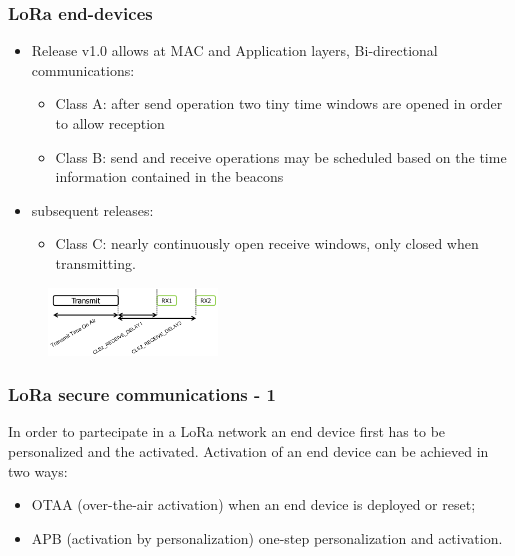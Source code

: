 \begin{frame}[fragile]
  \frametitle{LoRa end-devices}
  \begin{itemize}
   \item  Release v1.0 allows at MAC and Application layers, Bi-directional communications:
     \begin{itemize}
       \item Class A: after send operation two tiny time windows are opened in order to allow reception
       \item Class B: send and receive operations may be scheduled based on the time information contained in the beacons
     \end{itemize}
    \item subsequent releases:
     \begin{itemize}
       \item Class C: nearly continuously open receive windows, only closed when transmitting.
     \end{itemize}
  \end{itemize}
  \begin{figure}
  \centering
  \includegraphics[width=0.4\textwidth]{img/lora_rx_windows.png}
  \end{figure}

\end{frame}


\begin{frame}[fragile]
  \frametitle{LoRa secure communications - 1}
  In order to partecipate in a LoRa network an end device first has to be personalized and the activated.
  Activation of an end device can be achieved in two ways:
  \begin{itemize}
    \item OTAA (over-the-air activation) when an end device is deployed or reset;
    \item APB (activation by personalization) one-step personalization and activation.
  \end{itemize}
\end{frame}

